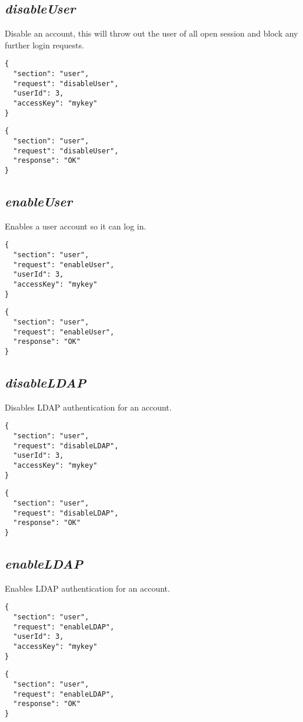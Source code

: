 \subsection*{\textit{disableUser}}
	Disable an account, this will throw out the user of all open session and block any further login requests.
	{
		\color{blue}
		\begin{verbatim}
{
  "section": "user",
  "request": "disableUser",
  "userId": 3,
  "accessKey": "mykey"
}
		\end{verbatim}
	}
	{
		\color{OliveGreen}
		\begin{verbatim}
{
  "section": "user",
  "request": "disableUser",
  "response": "OK"
}
		\end{verbatim}
	}
\subsection*{\textit{enableUser}}
	Enables a user account so it can log in.
	{
		\color{blue}
		\begin{verbatim}
{
  "section": "user",
  "request": "enableUser",
  "userId": 3,
  "accessKey": "mykey"
}
		\end{verbatim}
	}
	{
		\color{OliveGreen}
		\begin{verbatim}
{
  "section": "user",
  "request": "enableUser",
  "response": "OK"
}
		\end{verbatim}
	}
\subsection*{\textit{disableLDAP}}
	Disables LDAP authentication for an account.
	{
		\color{blue}
		\begin{verbatim}
{
  "section": "user",
  "request": "disableLDAP",
  "userId": 3,
  "accessKey": "mykey"
}
		\end{verbatim}
	}
	{
		\color{OliveGreen}
		\begin{verbatim}
{
  "section": "user",
  "request": "disableLDAP",
  "response": "OK"
}
		\end{verbatim}
	}
\subsection*{\textit{enableLDAP}}
	Enables LDAP authentication for an account.
	{
		\color{blue}
		\begin{verbatim}
{
  "section": "user",
  "request": "enableLDAP",
  "userId": 3,
  "accessKey": "mykey"
}
		\end{verbatim}
	}
	{
		\color{OliveGreen}
		\begin{verbatim}
{
  "section": "user",
  "request": "enableLDAP",
  "response": "OK"
}
		\end{verbatim}
	}
